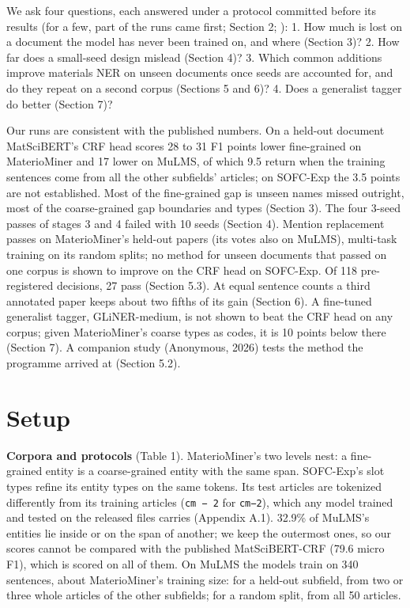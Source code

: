 \documentclass[11pt,a4paper]{article}
\begin{document}
We ask four questions, each answered under a protocol committed before
its results (for a few, part of the runs came first; Section 2;
\citealp{vanmiltenburg2021preregistering}):
1. How much is lost on a document the model has never been trained on, and
where (Section 3)?
2. How far does a small-seed design mislead (Section 4)?
3. Which common additions improve materials NER on unseen documents once
seeds are accounted for, and do they repeat on a second corpus
(Sections 5 and 6)?
4. Does a generalist tagger do better (Section 7)?

Our runs are consistent with the published numbers. On a held-out
document MatSciBERT's CRF head scores 28 to 31 F1 points lower fine-grained
on MaterioMiner and 17 lower on MuLMS, of which 9.5 return when the
training sentences come from all the other subfields' articles; on
SOFC-Exp the 3.5 points are not established. Most of the fine-grained gap
is unseen names missed outright, most of the coarse-grained gap boundaries
and types (Section 3). The four 3-seed passes of stages 3 and 4 failed with
10 seeds (Section 4). Mention replacement passes on MaterioMiner's held-out
papers (its votes also on MuLMS), multi-task training on its random
splits; no method for unseen documents that passed on one corpus is shown
to improve on the CRF head on SOFC-Exp. Of 118 pre-registered decisions, 27
pass (Section 5.3). At equal sentence counts a third annotated paper keeps
about two fifths of its gain (Section 6). A fine-tuned generalist tagger,
GLiNER-medium, is not shown to beat the CRF head on any corpus; given
MaterioMiner's coarse types as codes, it is 10 points below there (Section
7). A companion study (Anonymous, 2026) tests the method the programme
arrived at (Section 5.2).

\hypertarget{setup}{%
\section{Setup}\label{setup}}

\textbf{Corpora and protocols} (Table 1). MaterioMiner's two levels nest: a
fine-grained entity is a coarse-grained entity with the same span.
SOFC-Exp's slot types refine its entity types on the same tokens. Its test
articles are tokenized differently from its training articles (\texttt{cm\ −\ 2}
for \texttt{cm−2}), which any model trained and tested on the released files
carries (Appendix A.1). 32.9\% of MuLMS's entities lie
inside or on the span of another; we keep the outermost ones, so our
scores cannot be compared with the published MatSciBERT-CRF (79.6 micro
F1), which is scored on all of them. On MuLMS the models train on 340
sentences, about MaterioMiner's training size: for a held-out subfield,
from two or three whole articles of the other subfields; for a random
split, from all 50 articles.
\end{document}
